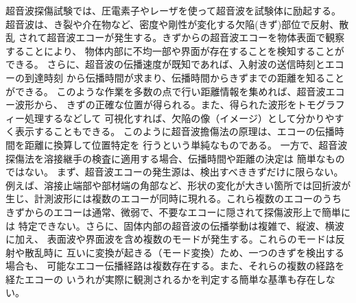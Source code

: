 %
%
超音波探傷試験では、圧電素子やレーザを使って超音波を試験体に励起する。
超音波は、き裂や介在物など、密度や剛性が変化する欠陥(きず)部位で反射、散乱
されて超音波エコーが発生する。きずからの超音波エコーを物体表面で観察することにより、
物体内部に不均一部や界面が存在することを検知することができる。
さらに、超音波の伝播速度が既知であれば、入射波の送信時刻とエコーの到達時刻
から伝播時間が求まり、伝播時間からきずまでの距離を知ることができる。
このような作業を多数の点で行い距離情報を集めれば、超音波エコー波形から、
きずの正確な位置が得られる。また、得られた波形をトモグラフィー処理するなどして
可視化すれば、欠陥の像（イメージ）として分かりやすく表示することもできる。
このように超音波擔傷法の原理は、エコーの伝播時間を距離に換算して位置特定を
行うという単純なものである。
一方で、超音波探傷法を溶接継手の検査に適用する場合、伝播時間や距離の決定は
簡単なものではない。
まず、超音波エコーの発生源は、検出すべききずだけに限らない。
例えば、溶接止端部や部材端の角部など、形状の変化が大きい箇所では回折波が
生じ、計測波形には複数のエコーが同時に現れる。これら複数のエコーのうち
きずからのエコーは通常、微弱で、不要なエコーに隠されて探傷波形上で簡単には
特定できない。さらに、固体内部の超音波の伝播挙動は複雑で、縦波、横波に加え、
表面波や界面波を含め複数のモードが発生する。これらのモードは反射や散乱時に
互いに変換が起きる（モード変換）ため、一つのきずを検出する場合も、
可能なエコー伝播経路は複数存在する。また、それらの複数の経路を経たエコーの
いうれが実際に観測されるかを判定する簡単な基準も存在しない。\\

